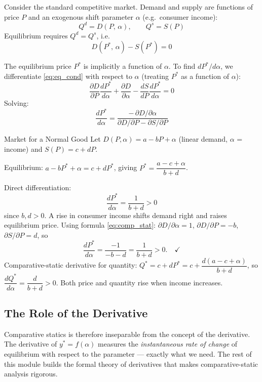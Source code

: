 \documentclass[12pt, a4paper]{article}
\theoremstyle{definition}
\newcommand{\ddd}[2]{\dfrac{d#1}{d#2}}
\newcommand{\pp}[2]{\dfrac{\partial #1}{\partial #2}}
\begin{document}
Consider the standard competitive market.  Demand and supply are functions of
price $P$ and an exogenous shift parameter $\alpha$ (e.g.\ consumer income):
\[
  Q^d = D(P,\,\alpha), \qquad Q^s = S(P)
\]
Equilibrium requires $Q^d = Q^s$, i.e.\
\begin{equation}
  D(P^*,\,\alpha) - S(P^*) = 0
  \label{eq:eq_cond}
\end{equation}

The equilibrium price $P^*$ is implicitly a function of $\alpha$.  To find
$dP^*/d\alpha$, we differentiate \eqref{eq:eq_cond} with respect to $\alpha$
(treating $P^*$ as a function of $\alpha$):
\[
  \pp{D}{P}\ddd{P^*}{\alpha} + \pp{D}{\alpha}
  - \ddd{S}{P}\ddd{P^*}{\alpha} = 0
\]
Solving:
\begin{equation}
  \ddd{P^*}{\alpha}
  = \frac{-\,\partial D/\partial\alpha}
         {\partial D/\partial P - \partial S/\partial P}
  \label{eq:comp_stat}
\end{equation}

\begin{exbox}{Market for a Normal Good}
Let $D(P,\alpha) = a - bP + \alpha$ (linear demand, $\alpha$ = income) and
$S(P) = c + dP$.

Equilibrium: $a - bP^* + \alpha = c + dP^*$, giving
$P^* = \dfrac{a - c + \alpha}{b + d}$.

Direct differentiation:
\[
  \ddd{P^*}{\alpha} = \frac{1}{b+d} > 0
\]
since $b,d>0$.  A rise in consumer income shifts demand right and raises
equilibrium price.  Using formula \eqref{eq:comp_stat}:
$\partial D/\partial\alpha = 1$, $\partial D/\partial P = -b$,
$\partial S/\partial P = d$, so
\[
  \ddd{P^*}{\alpha} = \frac{-1}{-b - d} = \frac{1}{b+d} > 0. \quad\checkmark
\]
Comparative-static derivative for quantity:
$Q^* = c + dP^* = c + \dfrac{d(a-c+\alpha)}{b+d}$, so
$\dfrac{dQ^*}{d\alpha} = \dfrac{d}{b+d} > 0$.
Both price and quantity rise when income increases.
\end{exbox}

\subsection{The Role of the Derivative}

Comparative statics is therefore inseparable from the concept of the derivative.
The derivative of $y^* = f(\alpha)$ measures the \emph{instantaneous rate of
change} of equilibrium with respect to the parameter --- exactly what we need.
The rest of this module builds the formal theory of derivatives that makes
comparative-static analysis rigorous.
\end{document}
